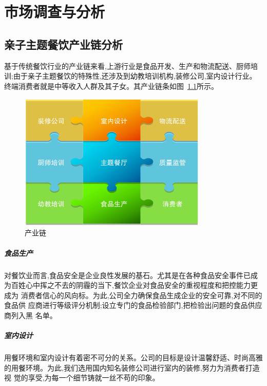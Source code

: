 \chapter{市场调查与分析}

\section{亲子主题餐饮产业链分析}
基于传统餐饮行业的产业链来看,上游行业是食品开发、生产和物流配送、厨师培
训;由于亲子主题餐饮的特殊性,还涉及到幼教培训机构,装修公司,室内设计行业。
终端消费者就是中等收入人群及其子女。其产业链条如图~\ref{fig:inds-chain}所示。
\begin{figure}
        \centering
        \caption{产业链}
        \label{fig:inds-chain}
        \includegraphics[width=0.8\textwidth ]{../images/company/inds-chain}
\end{figure}

\paragraph{食品生产}
对餐饮业而言,食品安全是企业良性发展的基石。尤其是在各种食品安全事件已成
为百姓心中挥之不去的阴霾的当下,餐饮企业对食品安全的重视程度和把控能力更成为
消费者信心的风向标。为此,公司全力确保食品生成企业的安全可靠,对不同的食品供
应商进行等级评分机制;设立专门的食品检验部门,把检验出问题的食品供应商列入黑
名单。

\paragraph{室内设计}
用餐环境和室内设计有着密不可分的关系。公司的目标是设计温馨舒适、时尚高雅
的用餐环境。为此,我们选用国内知名装修公司进行室内的装修,努力为消费者打造视
觉的享受,为每一个细节铸就一丝不苟的印象。

